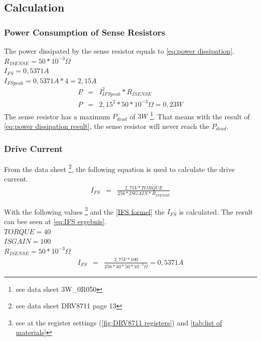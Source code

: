 \documentclass[a4paper,12pt]{scrreprt}
\begin{document}
\subsection{Calculation}\label{sec:calculation_drv8711}

\subsubsection{Power Consumption of Sense Resistors}
The power dissipated by the sense resistor equals to \autoref{eq:power dissipation}.\\
$R_{ISENSE}=50*10^{-3}\Omega$\\
$I_{FS}=0,5371A$\\
$I_{FSpeak}=0,5371A*4=2,15A$
\begin{eqnarray}
P&=&I_{IFSpeak}^{2}*R_{ISENSE}\label{eq:power dissipation}\\
P&=&2,15^{2}*50*10^{-3}\Omega = 0,23W\label{eq:power dissipation result}
\end{eqnarray}
The sense resistor has a maximum $P_{dead}$ of $3W$ \footnote{see data sheet 3W\_0R050}. That means with the result of \autoref{eq:power dissipation result}, the sense resistor will never reach the $P_{dead}$.
\subsubsection{Drive Current}

From the data sheet \footnote{see data sheet DRV8711 page 13}, the following equation is used to calculate the drive current.
\begin{eqnarray}
I_{FS}&=&\frac{2,75V*TORQUE}{256*ISGAIN*R_{ISENSE}}\label{IFS formel}
\end{eqnarray}

With the following values \footnote{see at the register settings (\autoref{fig:DRV8711 registers}) and \autoref{tab:list of materials}} and the \autoref{IFS formel} the $I_{FS}$ is calculated. The result can bee seen at \autoref{eq:IFS ergebnis}.\\
$TORQUE=40$\\
$ISGAIN=100$\\
$R_{ISENSE}=50*10^{-3}\Omega$
\begin{eqnarray}
I_{FS}&=&\frac{2,75V*100}{256*40*50*10^{-3}\Omega}=0,5371A\label{eq:IFS ergebnis}
\end{eqnarray}
\end{document}
